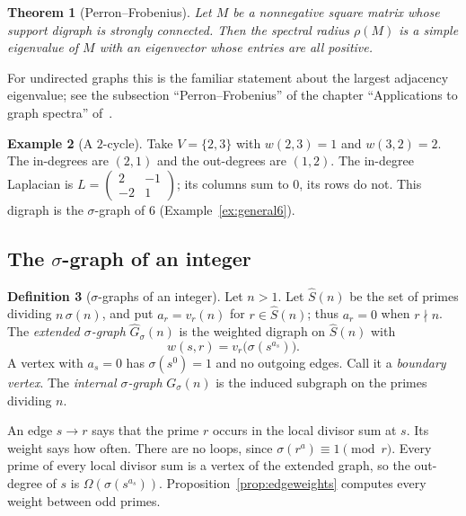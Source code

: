 \documentclass[11pt]{article}
\newtheorem{theorem}{Theorem}[section]
\theoremstyle{definition}
\newtheorem{definition}[theorem]{Definition}
\newtheorem{example}[theorem]{Example}
\theoremstyle{remark}
\begin{document}
\begin{theorem}[Perron--Frobenius]\label{thm:PF}
Let $M$ be a nonnegative square matrix whose support digraph is strongly
connected.  Then the spectral radius $\rho(M)$ is a simple eigenvalue of $M$
with an eigenvector whose entries are all positive.
\end{theorem}

For undirected graphs this is the familiar statement about the largest
adjacency eigenvalue; see the subsection ``Perron--Frobenius'' of the chapter
``Applications to graph spectra'' of~\cite{MJappl}.

\begin{example}[A $2$-cycle]\label{ex:twocycle}
Take $V=\{2,3\}$ with $w(2,3)=1$ and $w(3,2)=2$.  The in-degrees are $(2,1)$
and the out-degrees are $(1,2)$.  The in-degree Laplacian is
$L=\begin{pmatrix}2&-1\\-2&1\end{pmatrix}$; its columns sum to $0$, its rows
do not.  This digraph is the $\sigma$-graph of $6$
(Example~\ref{ex:general6}).
\end{example}

\subsection{The $\sigma$-graph of an integer}\label{sec:general}\label{sec:multiperfect}

\begin{definition}[$\sigma$-graphs of an integer]\label{def:general-sigma}
Let $n>1$.  Let $\widehat S(n)$ be the set of primes dividing
$n\,\sigma(n)$, and put $a_r=v_r(n)$ for $r\in\widehat S(n)$; thus $a_r=0$
when $r\nmid n$.  The \emph{extended $\sigma$-graph} $\widehat G_\sigma(n)$
is the weighted digraph on $\widehat S(n)$ with
\[
w(s,r)=v_r\bigl(\sigma(s^{a_s})\bigr).
\]
A vertex with $a_s=0$ has $\sigma(s^0)=1$ and no outgoing edges.  Call it a
\emph{boundary vertex}.  The \emph{internal $\sigma$-graph}
$G_\sigma(n)$ is the induced subgraph on the primes dividing $n$.
\end{definition}

An edge $s\to r$ says that the prime $r$ occurs in the local divisor sum at
$s$.  Its weight says how often.  There are no loops, since
$\sigma(r^{a})\equiv1\pmod r$.  Every prime of every local divisor sum is a
vertex of the extended graph, so the out-degree of $s$ is
$\Omega(\sigma(s^{a_s}))$.  Proposition~\ref{prop:edgeweights} computes every
weight between odd primes.
\end{document}
